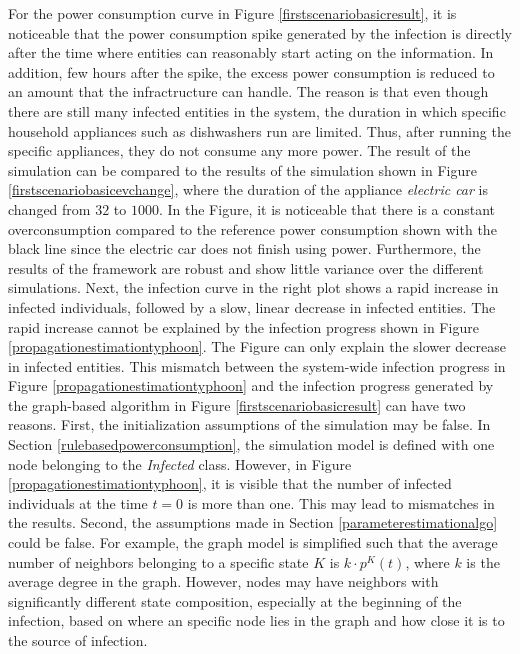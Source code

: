 For the power consumption curve in Figure \ref{firstscenariobasicresult}, 
it is noticeable
that the power consumption spike generated by the infection is directly
after the time where entities can reasonably start acting on the information.
In addition, few hours after the spike, the excess power consumption
is reduced to an amount that the infractructure can handle. 
The reason is that even though there are still many infected entities
in the system, the duration in which specific household appliances
such as dishwashers run are limited. Thus, after running the specific
appliances, they do not consume any more power. The result of the simulation
can be compared to the results of the simulation shown in 
Figure \ref{firstscenariobasicevchange}, where the duration of the 
appliance \textit{electric car} is changed from $32$ to $1000$.
In the Figure, it is noticeable 
that there is a constant overconsumption compared to the reference
power consumption shown with the black line since the electric car
does not finish using power.
Furthermore, the 
results of the framework are robust and show little variance over the
different simulations. 
Next, the infection curve in the right plot shows a rapid increase in infected 
individuals, followed by a slow, linear decrease in infected entities.
The rapid increase cannot be explained by the 
infection progress shown in Figure \ref{propagationestimationtyphoon}.
The Figure can only explain the slower decrease in infected entities. 
This mismatch between
the system-wide infection progress in Figure \ref{propagationestimationtyphoon}
and the infection progress generated by the graph-based algorithm 
in Figure \ref{firstscenariobasicresult} can have two reasons. 
First, the initialization assumptions of the simulation may be false.
In Section \ref{rulebasedpowerconsumption}, the simulation model
is defined with one node belonging to the \textit{Infected} class.
However, in Figure \ref{propagationestimationtyphoon}, it
is visible that the number of infected individuals at the 
time $t=0$ is more than one. This may lead to mismatches 
in the results. Second, the assumptions made in Section 
\ref{parameterestimationalgo} could be false. For example, 
the graph model is simplified such that the average number of 
neighbors belonging to a specific state $K$ is $k\cdot p^K(t)$, 
where $k$ is the average degree in the graph. However, nodes may 
have neighbors with significantly different state composition, 
especially at the beginning of the infection, based on where an specific 
node lies in the graph and how close it is to the source of 
infection.

